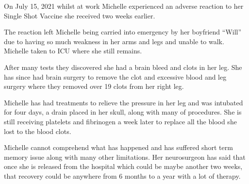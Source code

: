 On July 15, 2021 whilst at work Michelle experienced an adverse reaction to her
Single Shot Vaccine she received two weeks earlier.

The reaction left Michelle being carried into emergency by her boyfriend “Will”
due to having so much weakness in her arms and legs and unable to walk. Michelle
taken to ICU where she still remains.

After many tests they discovered she had a brain bleed and clots in her leg. She
has since had brain surgery to remove the clot and excessive blood and leg
surgery where they removed over 19 clots from her right leg.

Michelle has had treatments to relieve the pressure in her leg and was intubated
for four days, a drain placed in her skull, along with many of procedures. She
is still receiving platelets and fibrinogen a week later to replace all the
blood she lost to the blood clots.

Michelle cannot comprehend what has happened and has suffered short term memory
issue along with many other limitations. Her neurosurgeon has said that once she
is released from the hospital which could be maybe another two weeks, that
recovery could be anywhere from 6 months to a year with a lot of therapy.

